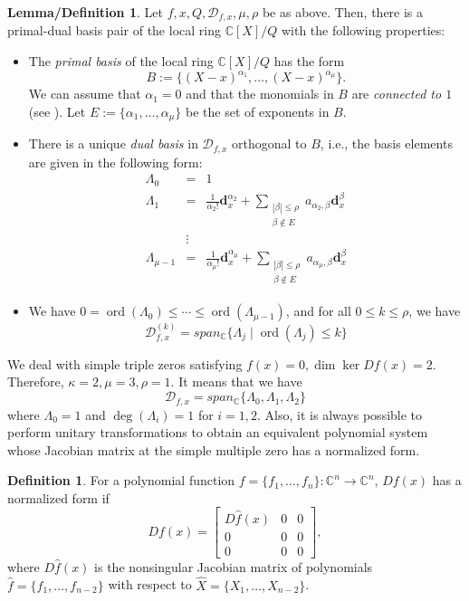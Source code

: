\documentclass[12pt,oneside,reqno]{amsart}
\theoremstyle{definition}
\newtheorem{lemdef}[thm]{Lemma/Definition}
\newtheorem{defi}[thm]{Definition}
\newcommand{\CC}{\mathbb{C}}
\DeclareMathOperator{\ord}{ord}
\begin{document}
\begin{lemdef}\cite[Lemma 4.1]{hauenstein2015certifying}
	Let $f,x,Q,\mathcal{D}_{f,x},\mu, \rho$ be as above. Then, there is a primal-dual basis pair of the local ring $\mathbb{C}[X]/Q$ with the following properties:
	\begin{itemize}
		\item The {\it primal basis} of the local ring $\mathbb{C}[X]/Q$ has the form
		\[B:=\{(X-x)^{\alpha_1},\dots, (X-x)^{\alpha_\mu}\}.\]
		We can assume that $\alpha_1=0$ and that the monomials in $B$ are {\it connected to $1$} (see \cite{mourrain1999new}). Let $E:=\{\alpha_1,\dots, \alpha_\mu\}$ be the set of exponents in $B$.
		\item There is a unique {\it dual basis} in $\mathcal{D}_{f,x}$ orthogonal to $B$, i.e., the basis elements are given in the following form:
		\begin{eqnarray*}
		\Lambda_0 & = & 1\\
		\Lambda_1 & = & \frac{1}{\alpha_2!}\mathbf{d}_x^{\alpha_2}+\sum\limits_{\substack{|\beta|\leq \rho\\ \beta \notin E}}a_{\alpha_2,\beta}\mathbf{d}^\beta_x\\
		&\vdots &\\
		\Lambda_{\mu-1} & = & \frac{1}{\alpha_{\mu}!}\mathbf{d}_x^{\alpha_\mu}+\sum\limits_{\substack{|\beta|\leq \rho\\ \beta \notin E}}a_{\alpha_\mu,\beta}\mathbf{d}^\beta_x		
		\end{eqnarray*}
		\item We have $0=\ord(\Lambda_0)\leq \cdots \leq \ord(\Lambda_{\mu-1})$, and for all $0\leq k \leq \rho$, we have
		\[\mathcal{D}_{f,x}^{(k)}=span_\CC\{\Lambda_j\mid \ord(\Lambda_j)\leq k\}\]
	\end{itemize}
\end{lemdef}


We deal with simple triple zeros satisfying $f(x)=0, \dim \ker Df(x)=2$. Therefore, $\kappa=2, \mu=3, \rho =1$.
It means that we have 
\[\mathcal{D}_{f,x}=span_\mathbb{C}\{\Lambda_0,\Lambda_1,\Lambda_2\}\]
where $\Lambda_0=1$ and $\deg(\Lambda_i)=1$ for $i=1,2$. Also, it is always possible to perform unitary transformations to obtain an equivalent polynomial system whose Jacobian matrix at the simple multiple zero has a normalized form.
\begin{defi}
	For a polynomial function $f=\{f_1,\dots, f_n\}:\mathbb{C}^n\rightarrow\mathbb{C}^n$, $Df(x)$ has a normalized form if 
	\[Df(x)=\begin{bmatrix}
	D\hat{f}(x) & 0 & 0\\
	0 & 0 & 0 \\
	0 & 0 & 0
	\end{bmatrix},\label{eq:normalizedForm}\]
	where $D\hat{f}(x)$ is the nonsingular Jacobian matrix of polynomials $\hat{f}=\{f_1,\dots, f_{n-2}\}$ with respect to $\hat{X}=\{X_1,\dots, X_{n-2}\}$.
\end{defi}
\end{document}
